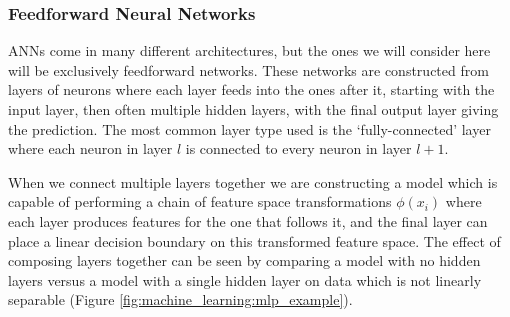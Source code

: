 \subsubsection{Feedforward Neural Networks}
ANNs come in many different architectures, but the ones we will consider here will be exclusively feedforward networks. 
These networks are constructed from layers of neurons where each layer feeds into the ones after it, starting with the input layer, then often multiple hidden layers, with the final output layer giving the prediction. 
The most common layer type used is the `fully-connected' layer where each neuron in layer $l$ is connected to every neuron in layer $l+1$.

When we connect multiple layers together we are constructing a model which is capable of performing a chain of feature space transformations $\phi(x_{i})$ where each layer produces features for the one that follows it, and the final layer can place a linear decision boundary on this transformed feature space. 
The effect of composing layers together can be seen by comparing a model with no hidden layers versus a model with a single hidden layer on data which is not linearly separable (Figure \ref{fig:machine_learning:mlp_example}).

